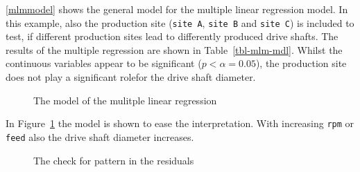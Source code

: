 \documentclass[
  a4paper,
]{scrbook}
\begin{document}
\eqref{mlmmodel} shows the general model for the multiple linear
regression model. In this example, also the production site
(\texttt{site\ A}, \texttt{site\ B} and \texttt{site\ C}) is included to
test, if different production sites lead to differently produced drive
shafts. The results of the multiple regression are shown in
Table~\ref{tbl-mlm-mdl}. Whilst the continuous variables appear to be
significant (\(p<\alpha = 0.05\)), the production site does not play a
significant rolefor the drive shaft diameter.

\begin{figure}[H]


\caption{\label{fig-mlm-mdl}The model of the mulitple linear regression}

\end{figure}%

In Figure~\ref{fig-mlm-mdl} the model is shown to ease the
interpretation. With increasing \texttt{rpm} or \texttt{feed} also the
drive shaft diameter increases.

\begin{figure}[H]


\caption{\label{fig-mlm-resid-pattern}The check for pattern in the
residuals}

\end{figure}%
\end{document}
